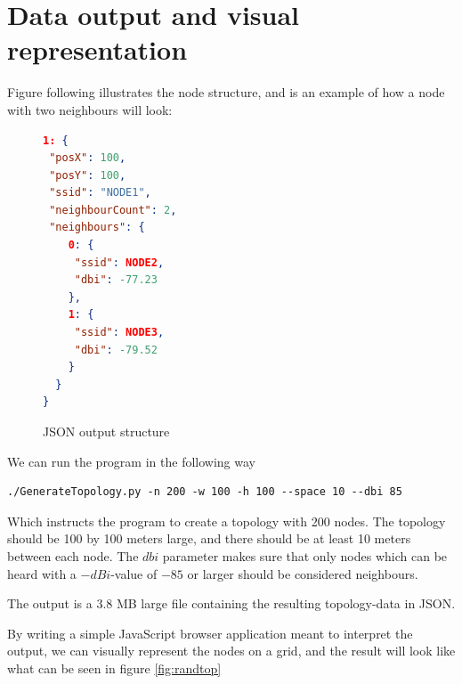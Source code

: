 			\section{Data output and visual representation} \label{simulationrep}
			Figure following illustrates the node structure, and is an example of how a node with two neighbours will look: 
			\begin{figure}[H]
			\begin{minipage}{\linewidth}
			\begin{lstlisting}[language=json]
1: {
 "posX": 100,
 "posY": 100, 
 "ssid": "NODE1",
 "neighbourCount": 2, 
 "neighbours": {
    0: {
     "ssid": NODE2,
     "dbi": -77.23
    },
    1: {
     "ssid": NODE3,
     "dbi": -79.52
    }
  }
}
\end{lstlisting}
\end{minipage}
\caption{JSON output structure}
\label{fig:nodeStruct}

\end{figure}
We can run the program in the following way
\begin{verbatim}./GenerateTopology.py -n 200 -w 100 -h 100 --space 10 --dbi 85 \end{verbatim}
Which instructs the program to create a topology with 200 nodes. 
The topology should be 100 by 100 meters large, and there should be at least 10 meters
between each node. The $dbi$ parameter makes sure that only nodes which can be
heard with a $-dBi$-value of $-85$ or larger should be considered neighbours.

The output is a 3.8 MB large file containing the resulting topology-data in JSON.

By writing a simple JavaScript browser application meant to interpret the output, we can
visually represent the nodes on a grid, and the result will look like what can be seen in figure \ref{fig:randtop}

